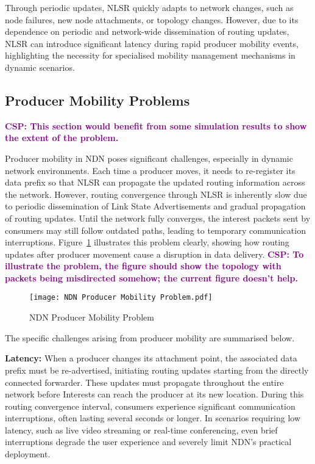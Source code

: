 \documentclass[conference]{IEEEtran}
\newcommand{\csp}[1]{\textbf{\textcolor{purple}{CSP: #1}}}
\begin{document}
Through periodic updates, NLSR quickly adapts to network changes, such as node failures, new node attachments, or topology changes. However, due to its dependence on periodic and network-wide dissemination of routing updates, NLSR can introduce significant latency during rapid producer mobility events, highlighting the necessity for specialised mobility management mechanisms in dynamic scenarios.

\subsection{Producer Mobility Problems}
\csp{This section would benefit from some simulation results to show the extent of the problem.}

Producer mobility in NDN poses significant challenges, especially in dynamic network environments. Each time a producer moves, it needs to re-register its data prefix so that NLSR can propagate the updated routing information across the network. However, routing convergence through NLSR is inherently slow due to periodic dissemination of Link State Advertisements and gradual propagation of routing updates. Until the network fully converges, the interest packets sent by consumers may still follow outdated paths, leading to temporary communication interruptions. Figure~\ref{fig:NDN Producer Mobility Problem} illustrates this problem clearly, showing how routing updates after producer movement cause a disruption in data delivery. \csp{To illustrate the problem, the figure should show the topology with packets being misdirected somehow; the current figure doesn't help.}

\begin{figure}[h]
    \centering
    \texttt{[image: NDN Producer Mobility Problem.pdf]}
    \caption{NDN Producer Mobility Problem}
    \label{fig:NDN Producer Mobility Problem}
\end{figure}

The specific challenges arising from producer mobility are summarised below.

\textbf{Latency:} When a producer changes its attachment point, the associated data prefix must be re-advertised, initiating routing updates starting from the directly connected forwarder. These updates must propagate throughout the entire network before Interests can reach the producer at its new location. During this routing convergence interval, consumers experience significant communication interruptions, often lasting several seconds or longer. In scenarios requiring low latency, such as live video streaming or real-time conferencing, even brief interruptions degrade the user experience and severely limit NDN's practical deployment.
\end{document}
